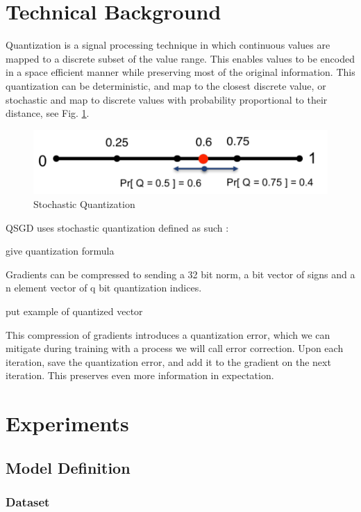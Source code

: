 \documentclass[10pt,conference,compsocconf]{IEEEtran}
\begin{document}
\section{Technical Background}

Quantization is a signal processing technique in which continuous values are mapped to a discrete subset of the value range. This enables values to be encoded in a space efficient manner while preserving most of the original information. This quantization can be deterministic, and map to the closest discrete value, or stochastic and map to discrete values with probability proportional to their distance, see Fig. \ref{fig:quant}. 

\begin{figure}[b]
  \centering
  \includegraphics[scale=0.45]{quant}
  \caption{Stochastic Quantization}
  \vspace{-3mm}
  \label{fig:quant}
\end{figure}

QSGD uses stochastic quantization defined as such :

give quantization formula

Gradients can be compressed to sending a 32 bit norm, a bit vector of signs and a n element vector of q bit quantization indices.

put example of quantized vector


This compression of gradients introduces a quantization error, which we can mitigate during training with a process we will call error correction. Upon each iteration, save the quantization error, and add it to the gradient on the next iteration. This preserves even more information in expectation.


\section{Experiments}

\subsection{Model Definition}

\subsubsection{Dataset}
\end{document}
